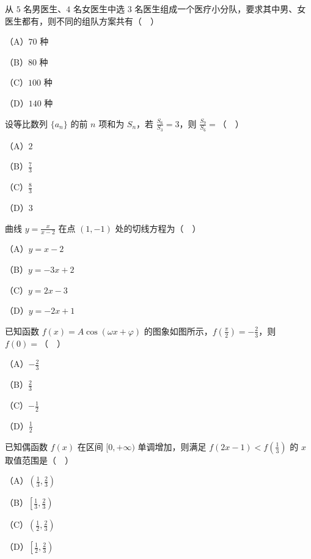 \begin{question}
从 $5$ 名男医生、$4$ 名女医生中选 $3$ 名医生组成一个医疗小分队，要求其中男、女医生都有，则不同的组队方案共有（　）

（A）$70$ 种

（B）$80$ 种

（C）$100$ 种

（D）$140$ 种

\end{question}
\begin{question}
设等比数列 $\{a_n\}$ 的前 $n$ 项和为 $S_n$，若 $\frac{S_6}{S_3}=3$，则 $\frac{S_9}{S_6}=$（　）

（A）$2$

（B）$\frac73$

（C）$\frac83$

（D）$3$

\end{question}
\begin{question}
曲线 $y=\frac{x}{x-2}$ 在点 $(1,-1)$ 处的切线方程为（　）

（A）$y=x-2$

（B）$y=-3x+2$

（C）$y=2x-3$

（D）$y=-2x+1$

\Needspace{0.4\textheight}
\end{question}
\begin{question}
已知函数 $f(x)=A\cos(\omega x+\varphi)$ 的图象如图所示，$f\left(\frac{\pi}{2}\right)=-\frac23$，则 $f(0)=$（　）

（A）$-\frac23$

（B）$\frac23$

（C）$-\frac12$

（D）$\frac12$
\nopagebreak[4]
\begin{center}\end{center}
\nopagebreak[4]
\end{question}
\begin{question}
已知偶函数 $f(x)$ 在区间 $[0,+\infty)$ 单调增加，则满足 $f(2x-1)<f\left(\frac13\right)$ 的 $x$ 取值范围是（　）

（A）$\left(\frac13,\frac23\right)$

（B）$\left[\frac13,\frac23\right)$

（C）$\left(\frac12,\frac23\right)$

（D）$\left[\frac12,\frac23\right)$

\Needspace{0.4\textheight}
\end{question}
